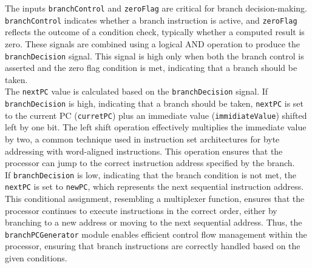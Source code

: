 The inputs \texttt{branchControl} and \texttt{zeroFlag} are critical for branch decision-making. \texttt{branchControl} indicates whether a branch instruction is active, and \texttt{zeroFlag} reflects the outcome of a condition check, typically whether a computed result is zero. These signals are combined using a logical AND operation to produce the \texttt{branchDecision} signal. This signal is high only when both the branch control is asserted and the zero flag condition is met, indicating that a branch should be taken. 
\\ 
\hfill \break
The \texttt{nextPC} value is calculated based on the \texttt{branchDecision} signal. If \texttt{branchDecision} is high, indicating that a branch should be taken, \texttt{nextPC} is set to the current PC (\texttt{curretPC}) plus an immediate value (\texttt{immidiateValue}) shifted left by one bit. The left shift operation effectively multiplies the immediate value by two, a common technique used in instruction set architectures for byte addressing with word-aligned instructions. This operation ensures that the processor can jump to the correct instruction address specified by the branch. 
\\ 
\hfill \break
If \texttt{branchDecision} is low, indicating that the branch condition is not met, the \texttt{nextPC} is set to \texttt{newPC}, which represents the next sequential instruction address. This conditional assignment, resembling a multiplexer function, ensures that the processor continues to execute instructions in the correct order, either by branching to a new address or moving to the next sequential address. Thus, the \texttt{branchPCGenerator} module enables efficient control flow management within the processor, ensuring that branch instructions are correctly handled based on the given conditions.


